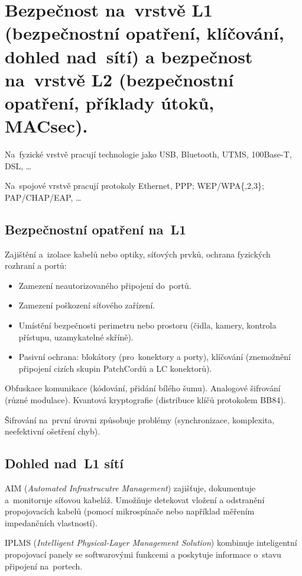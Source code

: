 \section{Bezpečnost na~vrstvě L1 (bezpečnostní opatření, klíčování, dohled nad~sítí) a bezpečnost na~vrstvě L2 (bezpečnostní opatření, příklady útoků, MACsec).}

Na~fyzické vrstvě pracují technologie jako USB, Bluetooth, UTMS, 100Base-T, DSL, \dots

Na~spojové vrstvě pracují protokoly Ethernet, PPP; WEP/WPA\{,2,3\}; PAP/CHAP/EAP, \dots


\subsection{Bezpečnostní opatření na~L1}

Zajištění a~izolace kabelů nebo optiky, síťových prvků, ochrana fyzických rozhraní a portů:
\begin{itemize}
	\item Zamezení neautorizovaného připojení do~portů.
	\item Zamezení poškození síťového zařízení.
	\item Umístění bezpečnosti perimetru nebo prostoru (čidla, kamery, kontrola přístupu, uzamykatelné skříně).
	\item Pasivní ochrana: blokátory (pro~konektory a porty), klíčování (znemožnění připojení cizích skupin PatchCordů a LC konektorů).
\end{itemize}

Obfuskace komunikace (kódování, přidání bílého šumu).
Analogové šifrování (různé modulace).
Kvantová kryptografie (distribuce klíčů protokolem BB84).

Šifrování na~první úrovni způsobuje problémy (synchronizace, komplexita, neefektivní ošetření chyb).


\subsection{Dohled nad~L1 sítí}

AIM (\emph{Automated Infrastrucutre Management}) zajišťuje, dokumentuje a~monitoruje síťovou kabeláž.
Umožňuje detekovat vložení a odstranění propojovacích kabelů (pomocí mikrospínače nebo například měřením impedančních vlastností).

IPLMS (\emph{Intelligent Physical-Layer Management Solution}) kombinuje inteligentní propojovací panely se softwarovými funkcemi a poskytuje informace o~stavu připojení na~portech.


